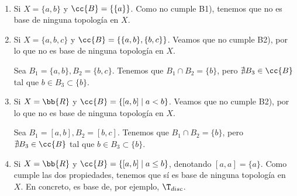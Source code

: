 \begin{ejemplo}\
    \begin{enumerate}
        \item Si $X=\{a,b\}$ y $\cc{B}=\{\{a\}\}$. Como no cumple B1), tenemos que no es base de ninguna topología en $X$.

        \item Si $X=\{a,b,c\}$ y $\cc{B}=\{\{a,b\}, \{b,c\}\}$. Veamos que no cumple B2), por lo que no es base de ninguna topología en $X$.

        Sea $B_1=\{a,b\}, B_2=\{b,c\}$. Tenemos que $B_1\cap B_2=\{b\}$, pero $\nexists B_3\in \cc{B}$ tal que $b\in B_3\subset \{b\}$.

        \item Si $X=\bb{R}$ y $\cc{B}=\{[a,b]\mid a<b\}$. Veamos que no cumple B2), por lo que no es base de ninguna topología en $X$.

        Sea $B_1=[a,b], B_2=[b,c]$. Tenemos que $B_1\cap B_2=\{b\}$, pero $\nexists B_3\in \cc{B}$ tal que $b\in B_3\subset \{b\}$.

        \item Si $X=\bb{R}$ y $\cc{B}=\{[a,b]\mid a\leq b\}$, denotando $[a,a]=\{a\}$. Como cumple las dos propiedades, tenemos que sí es base de ninguna topología en $X$. En concreto, es base de, por ejemplo, $\T_{disc}$.
    \end{enumerate}
\end{ejemplo}



